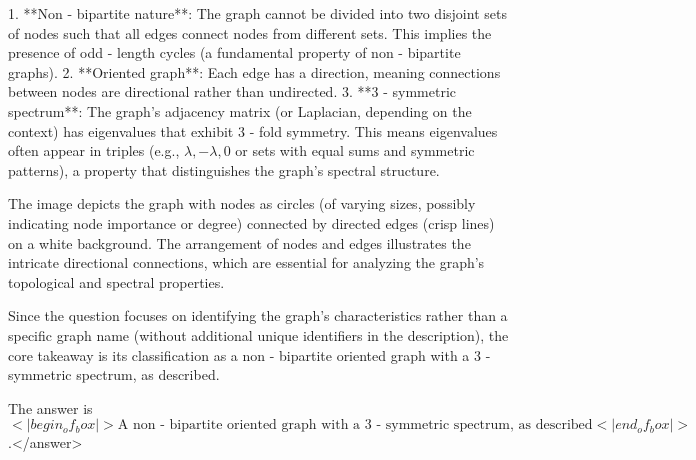 1. **Non - bipartite nature**: The graph cannot be divided into two disjoint sets of nodes such that all edges connect nodes from different sets. This implies the presence of odd - length cycles (a fundamental property of non - bipartite graphs).  
2. **Oriented graph**: Each edge has a direction, meaning connections between nodes are directional rather than undirected.  
3. **3 - symmetric spectrum**: The graph’s adjacency matrix (or Laplacian, depending on the context) has eigenvalues that exhibit 3 - fold symmetry. This means eigenvalues often appear in triples (e.g., \( \lambda, -\lambda, 0 \) or sets with equal sums and symmetric patterns), a property that distinguishes the graph’s spectral structure.  

The image depicts the graph with nodes as circles (of varying sizes, possibly indicating node importance or degree) connected by directed edges (crisp lines) on a white background. The arrangement of nodes and edges illustrates the intricate directional connections, which are essential for analyzing the graph’s topological and spectral properties.  

Since the question focuses on identifying the graph’s characteristics rather than a specific graph name (without additional unique identifiers in the description), the core takeaway is its classification as a non - bipartite oriented graph with a 3 - symmetric spectrum, as described.  

The answer is \(<|begin_of_box|>\text{A non - bipartite oriented graph with a 3 - symmetric spectrum, as described}<|end_of_box|>\).</answer>